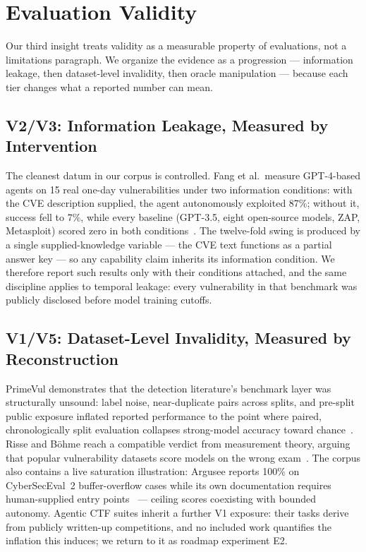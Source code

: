 \section{Evaluation Validity}
\label{sec:validity}

Our third insight treats validity as a measurable property of evaluations, not a limitations
paragraph. We organize the evidence as a progression --- information leakage, then dataset-level
invalidity, then oracle manipulation --- because each tier changes what a reported number can
mean.

\subsection{V2/V3: Information Leakage, Measured by Intervention}
The cleanest datum in our corpus is controlled. Fang et al.\ measure GPT-4-based agents on 15
real one-day vulnerabilities under two information conditions: with the CVE description
supplied, the agent autonomously exploited 87\%; without it, success fell to 7\%, while every
baseline (GPT-3.5, eight open-source models, ZAP, Metasploit) scored zero in both
conditions~\cite{fang2024agents}. The twelve-fold swing is produced by a single
supplied-knowledge variable --- the CVE text functions as a partial answer key --- so any
capability claim inherits its information condition. We therefore report such results only with
their conditions attached, and the same discipline applies to temporal leakage: every
vulnerability in that benchmark was publicly disclosed before model training cutoffs.

\subsection{V1/V5: Dataset-Level Invalidity, Measured by Reconstruction}
PrimeVul demonstrates that the detection literature's benchmark layer was structurally
unsound: label noise, near-duplicate pairs across splits, and pre-split public exposure
inflated reported performance to the point where paired, chronologically split evaluation
collapses strong-model accuracy toward chance~\cite{primevul2024}. Risse and B\"ohme reach a
compatible verdict from measurement theory, arguing that popular vulnerability datasets score
models on the wrong exam~\cite{rissebohme2024}. The corpus also contains a live saturation
illustration: Argusee reports 100\% on CyberSecEval~2 buffer-overflow cases while its own
documentation requires human-supplied entry points~\cite{darknavyargusee2025} --- ceiling
scores coexisting with bounded autonomy. Agentic CTF suites inherit a further V1 exposure:
their tasks derive from publicly written-up competitions, and no included work quantifies the
inflation this induces; we return to it as roadmap experiment E2.

